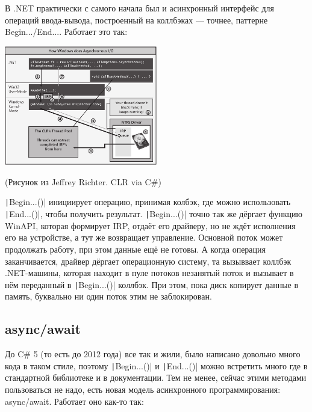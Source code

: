 \documentclass{../../text-style}
\begin{document}
В .NET практически с самого начала был и асинхронный интерфейс для операций ввода-вывода, построенный на коллбэках --- точнее, паттерне Begin.../End.... Работает это так:

\begin{center}
    \includegraphics[width=0.5\textwidth]{windowsAsynchronousIO.png}

    \begin{footnotesize}(Рисунок из Jeffrey Richter. CLR via C\#)\end{footnotesize}
\end{center}

\texttt|Begin...()| инициирует операцию, принимая колбэк, где можно использовать \texttt|End...()|, чтобы получить результат. \texttt|Begin...()| точно так же дёргает функцию WinAPI, которая формирует IRP, отдаёт его драйверу, но не ждёт исполнения его на устройстве, а тут же возвращает управление. Основной поток может продолжать работу, при этом данные ещё не готовы. А когда операция заканчивается, драйвер дёргает операционную систему, та вызыввает коллбэк .NET-машины, которая находит в пуле потоков незанятый поток и вызывает в нём переданный в \texttt|Begin...()| коллбэк. При этом, пока диск копирует данные в память, буквально ни один поток этим не заблокирован.

\subsection{async/await}

До C\# 5 (то есть до 2012 года) все так и жили, было написано довольно много кода в таком стиле, поэтому \texttt|Begin...()| и \texttt|End...()| можно встретить много где в стандартной библиотеке и в документации. Тем не менее, сейчас этими методами пользоваться не надо, есть новая модель асинхронного программирования: async/await. Работает оно как-то так:
\end{document}
